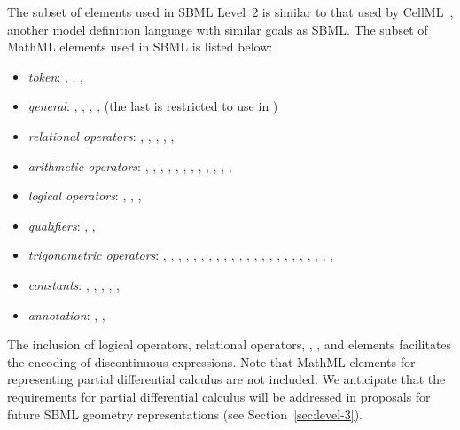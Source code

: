 The subset of \mathmltwo elements used in SBML Level~2 is similar
to that used by CellML~\citep{hedley:2001b}, another model
definition language with similar goals as SBML.  The subset of
MathML elements used in SBML is listed below:
\begin{itemize}\setlength{\parskip}{-0.2ex}

\item \emph{token}: , , ,
  
\item \emph{general}: , ,
  , ,  (the last is
  restricted to use in \FunctionDefinition)

\item \emph{relational operators}: , ,
  , , , 

\item \emph{arithmetic operators}: , ,
  , , , ,
  , , , ,
  , , 

\item \emph{logical operators}: , ,
  , 

\item \emph{qualifiers}: , ,

\item \emph{trigonometric operators}: , ,
  , , , ,
  , , , ,
  , , , ,
  , , , ,
  , , ,
  , , 

\item \emph{constants}: , ,
  , , ,

\item \emph{annotation}: , ,

\end{itemize}
\vspace*{-0.75ex}
The inclusion of logical operators, relational operators,
, , and  elements
facilitates the encoding of discontinuous expressions.  Note that
MathML elements for representing partial differential calculus are
not included.  We anticipate that the requirements for partial
differential calculus will be addressed in proposals for future
SBML geometry representations (see Section~\ref{sec:level-3}).

